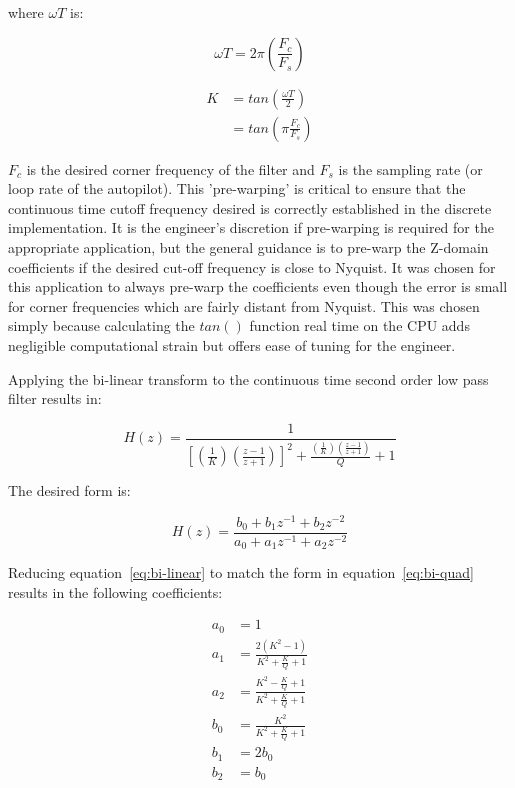 where $\omega T$ is:

\begin{equation}
	\omega T = 2\pi\left(\frac{F_c}{F_s}\right)
\end{equation}

\begin{equation}
\begin{split}
	K &= tan\left(\frac{\omega T}{2}\right) \\
	&= tan\left(\pi\frac{F_c}{F_s}\right)
\end{split}
\end{equation}



$F_c$ is the desired corner frequency of the filter and $F_s$ is the sampling rate (or loop rate of the autopilot).
This 'pre-warping' is critical to ensure that the continuous time cutoff frequency desired is correctly established in the discrete implementation.  It is the engineer's discretion if pre-warping is required for the appropriate application, but the general guidance is to pre-warp the Z-domain coefficients if the desired cut-off frequency is close to Nyquist.  It was chosen for this application to always pre-warp the coefficients even though the error is small for corner frequencies which are fairly distant from Nyquist.  This was chosen simply because calculating the $tan()$ function real time on the CPU adds negligible computational strain but offers ease of tuning for the engineer.

Applying the bi-linear transform to the continuous time second order low pass filter results in:

\begin{equation}\label{eq:bi-linear}
	H(z) = \frac{1}{ \left[\left(\frac{1}{K}\right)\left(\frac{z-1}{z+1}\right)\right]^2+\frac{ \left(\frac{1}{K}\right)\left(\frac{z-1}{z+1}\right)}{Q}+1}
\end{equation}

The desired form is:

\begin{equation}\label{eq:bi-quad}
	H(z) = \frac{b_0 + b_1 z^{-1} + b_2 z^{-2}}{a_0 + a_1 z^{-1} + a_2 z^{-2}}
\end{equation}

Reducing equation~\ref{eq:bi-linear} to match the form in equation~\ref{eq:bi-quad} results in the following coefficients:

\begin{equation}
\begin{split}
	a_0 &= 1 \\
	a_1 &= \frac{2(K^2-1)}{K^2+\frac{K}{Q}+1} \\
	a_2 &= \frac{K^2-\frac{K}{Q}+1}{K^2+\frac{K}{Q}+1} \\
	b_0 &= \frac{K^2}{K^2+\frac{K}{Q}+1} \\
	b_1 &= 2b_0 \\
	b_2 &= b_0 	
\end{split}
\end{equation}

